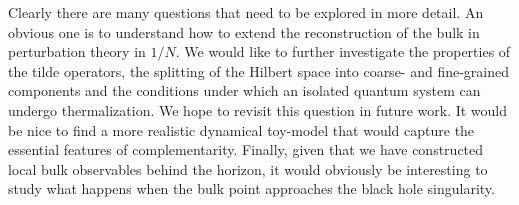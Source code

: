 \vskip10pt

 Clearly there are many questions that need to be explored in more detail. An obvious one is to understand how to extend the reconstruction of the bulk in perturbation theory in $1/N$. We would like to further investigate the properties of the tilde operators, the splitting of the Hilbert space into coarse- and fine-grained components and the conditions under which an isolated quantum system can undergo thermalization. We hope to revisit this question in future work.
It would be nice to find a more realistic dynamical toy-model that would capture the essential features of complementarity. Finally, given that we have constructed local bulk observables behind the horizon, it would obviously be interesting to study what happens when the bulk point approaches the black hole singularity.


